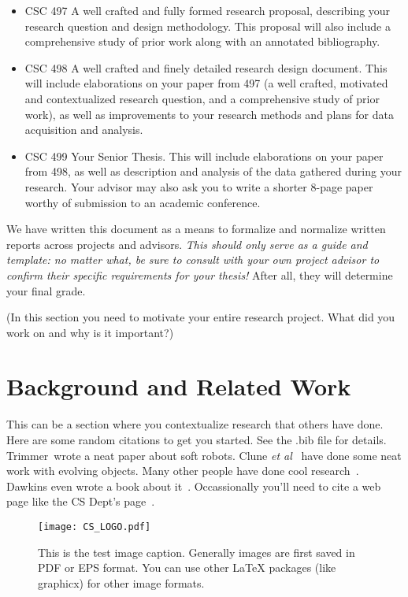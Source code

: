 \documentclass[final]{union-cs-thesis}
\begin{document}
\begin{itemize}
\item{CSC 497} A well crafted and fully formed research proposal,
describing your research question and design methodology.  This
proposal will also include a comprehensive study of prior work along
with an annotated bibliography.

\item{CSC 498} A well crafted and finely detailed research design
document.  This will include elaborations on your paper from 497 (a
well crafted, motivated and  contextualized research question, and a
comprehensive study of prior work), as well as improvements to your
research methods and plans for data acquisition and analysis.

\item{CSC 499} Your Senior Thesis.  This will include elaborations on your
paper from 498, as well as description and analysis of the data
gathered during your research.  Your advisor may also ask you to write
a shorter 8-page paper worthy of submission to an academic conference.

\end{itemize}

We have written this document as a means to formalize and normalize
written reports across projects and advisors.  {\em This should only
serve as a guide and template: no matter what, be sure
to consult with your own project advisor to confirm their specific
requirements for your thesis!}  After all, they will determine your
final grade.

(In this section you need to motivate your entire research project.
What did you work on and why is it important?)

\section{Background and Related Work}\label{sec:background}

This can be a section where you contextualize research that others
have done.  Here are some random citations to get you started.  See
the .bib file for details.  Trimmer~\cite{trimmer-goqbot}wrote a neat paper about soft
robots.  Clune {\em et al}~\cite{clune-endless} have done some neat
work with evolving objects.  Many other people have done cool
research~\cite{bongard-3d-cppn,Lobo:form}.  Dawkins even wrote a book
about it~\cite{dawkins:blind}.  Occassionally you'll need to cite a
web page like the CS Dept's page~\cite{cswebpage}.
\begin{figure}
\centering
\texttt{[image: CS\_LOGO.pdf]}
\caption{This is the test image caption.  Generally images are first
saved in PDF or EPS format.  You can use other LaTeX packages (like
graphicx) for other image
formats.} \label{fig:cslogo}
\end{figure}
\end{document}
